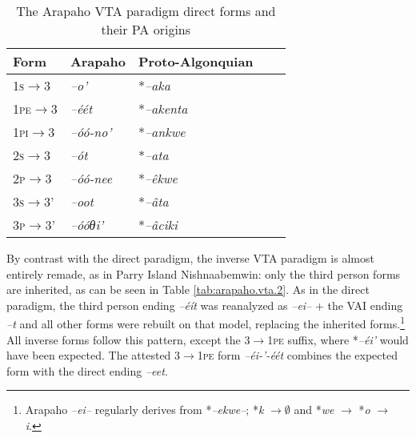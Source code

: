 \documentclass[twoside,a4paper,11pt]{article}
\newcommand{\ipa}[1]{{\phon\textit{#1}}}
\newcommand{\grise}[1]{\cellcolor{lightgray}\textbf{#1}}
\newcommand{\Σ}{\greek{Σ}}
\begin{document}
\begin{table}[H]
\caption{The Arapaho VTA paradigm direct forms and their PA origins}
\centering \label{tab:arapaho.vta.1}
\begin{tabular}{lllll}
\toprule
Form& Arapaho & Proto-Algonquian \\
\midrule
 \textsc{1s}$\rightarrow$3 & 	\ipa{--o'} & 	*\ipa{--aka} & 		\\		
\textsc{1pe}$\rightarrow$3 & 	\ipa{--éét}\grise{} & 	 *\ipa{--akenta} & 		\\		
\textsc{1pi}$\rightarrow$3 & 	\ipa{--óó-no'}\grise{} & *\ipa{--ankwe} & 		\\		
\midrule
\textsc{2s}$\rightarrow$3 & 	\ipa{--ót} & 	*\ipa{--ata} & 		\\		
\textsc{2p}$\rightarrow$3 & 	\ipa{--óó-nee} \grise{}& *\ipa{--êkwe} & 		\\		
\midrule
\textsc{3s}$\rightarrow$3' & 	\ipa{--oot} & 	*\ipa{--âta} & 		\\		
\textsc{3p}$\rightarrow$3' & 	\ipa{--óóθi'} & 	*\ipa{--âciki} & 		\\		
\bottomrule
\end{tabular}
\end{table}

By contrast with the direct paradigm, the inverse   VTA paradigm is almost entirely remade, as in Parry Island Nishnaabemwin: only the third person forms are inherited, as can be seen in Table \ref{tab:arapaho.vta.2}. As in the direct paradigm, the third person ending \ipa{--éít} was reanalyzed as \ipa{--ei--} + the VAI ending \ipa{--t} and all other forms were rebuilt on that model, replacing the inherited forms.\footnote{Arapaho \ipa{--ei--} regularly derives from *\ipa{--ekwe--}; *\ipa{k} $\rightarrow \emptyset $ and *\ipa{we} $\rightarrow $ *\ipa{o} $\rightarrow $ \ipa{i}. } All inverse forms follow this pattern, except the \textsc{3$\rightarrow$1pe} suffix, where *\ipa{--éi'} would have been expected. The attested \textsc{3$\rightarrow$1pe} form \ipa{--éi-'-éét} combines the expected form with the direct ending \ipa{--eet}.
\end{document}
